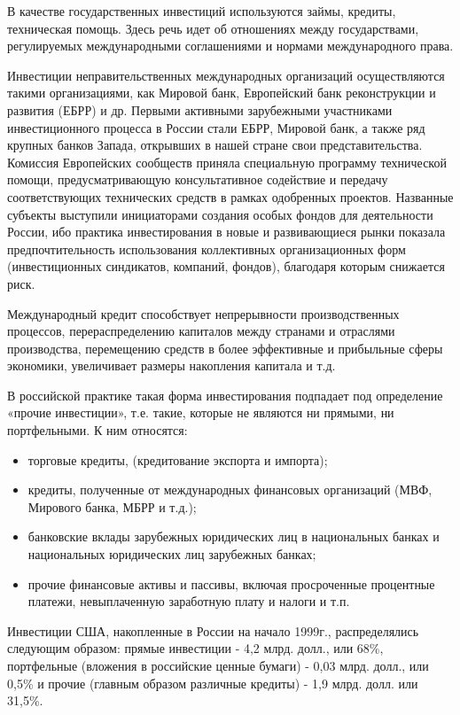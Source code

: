 В качестве государственных инвестиций используются займы, кредиты, техническая помощь. Здесь речь идет об отношениях между государствами, регулируемых международными соглашениями и нормами международного права.

Инвестиции неправительственных международных организаций осуществляются такими организациями, как Мировой банк, Европейский банк реконструкции и развития (ЕБРР) и др. Первыми активными зарубежными участниками инвестиционного процесса в России стали ЕБРР, Мировой банк, а также ряд крупных банков Запада, открывших в нашей стране свои представительства. Комиссия Европейских сообществ приняла специальную программу технической помощи, предусматривающую консультативное содействие и передачу соответствующих технических средств в рамках одобренных проектов. Названные субъекты выступили инициаторами создания особых фондов для деятельности России, ибо практика инвестирования в новые и развивающиеся рынки показала предпочтительность использования коллективных организационных форм (инвестиционных синдикатов, компаний, фондов), благодаря которым снижается риск.

Международный кредит способствует непрерывности производственных процессов, перераспределению капиталов между странами и отраслями производства, перемещению средств в более эффективные и прибыльные сферы экономики, увеличивает размеры накопления капитала и т.д.

В российской практике такая форма инвестирования подпадает под определение «прочие инвестиции», т.е. такие, которые не являются ни прямыми, ни портфельными. К ним относятся:
\begin{itemize}
	\item торговые кредиты, (кредитование экспорта и импорта);
\item кредиты, полученные от международных финансовых организаций (МВФ, Мирового банка, МБРР и т.д.);
\item банковские вклады зарубежных юридических лиц в национальных банках и национальных юридических лиц зарубежных банках;
\item прочие финансовые активы и пассивы, включая просроченные процентные платежи, невыплаченную заработную плату и налоги и т.п.
\end{itemize}

Инвестиции США, накопленные в России на начало 1999г., распределялись следующим образом: прямые инвестиции - 4,2 млрд. долл., или 68\%, портфельные (вложения в российские ценные бумаги) - 0,03 млрд. долл., или 0,5\% и прочие (главным образом различные кредиты) - 1,9 млрд. долл. или 31,5\%.

